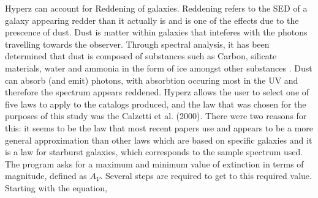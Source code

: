 Hyperz can account for Reddening of galaxies. Reddening refers to the SED of a galaxy appearing redder than it actually is and is one of the effects due to the prescence of dust. Dust is matter within galaxies that inteferes with the photons travelling towards the observer. Through spectral analysis, it has been determined that dust is composed of substances such as Carbon, silicate materials, water and ammonia in the form of ice amongst other substances \cite{stein1983dust}. Dust can absorb (and emit) photons, with absorbtion occuring most in the UV and therefore the spectrum appears reddened\cite{stein1983dust}. Hyperz allows the user to select one of five laws to apply to the catalogs produced, and the law that was chosen for the purposes of this study was the Calzetti et al. (2000). There were two reasons for this: it seems to be the law that most recent papers use and appears to be a more general approximation than other laws which are based on specific galaxies and it is a law for starburst galaxies, which corresponds to the sample spectrum used. The program asks for a maximum and minimum value of extinction in terms of magnitude, defined as $A_V$. Several steps are required to get to this required value. Starting with the equation,

